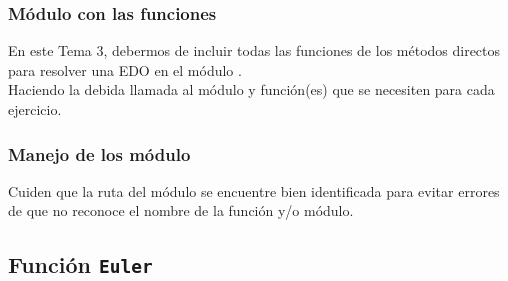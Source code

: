 \documentclass[12pt]{beamer}
\begin{document}
\begin{frame}
\frametitle{Módulo con las funciones}
En este Tema 3, debermos de incluir todas las funciones de los métodos directos para resolver una EDO en el módulo .
\\
\bigskip
\pause
Haciendo la debida llamada al módulo y función(es) que se necesiten para cada ejercicio.
\end{frame}
\begin{frame}
\frametitle{Manejo de los módulo}
Cuiden que la ruta del módulo se encuentre bien identificada para evitar errores de que no reconoce el nombre de la función y/o módulo.
\end{frame}

\subsection{Función \texttt{Euler}}
\end{document}
